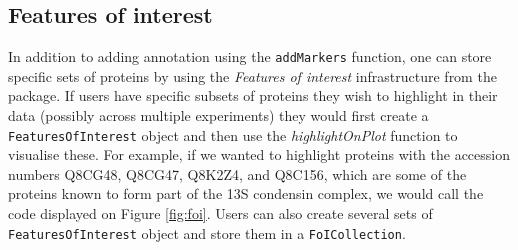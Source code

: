 \pagebreak

\subsection*{Features of interest}
In addition to adding annotation using the \texttt{addMarkers}
function, one can store specific sets of proteins by using the
\textit{Features of interest} infrastructure from the
 package. If users have specific subsets of proteins
they wish to highlight in their data (possibly across multiple
experiments) they would first create a \texttt{FeaturesOfInterest}
object and then use the \textit{highlightOnPlot} function to
visualise these. For example, if we wanted to highlight
proteins with the accession numbers Q8CG48, Q8CG47, Q8K2Z4, and
Q8C156, which are some of the proteins known to form part of the
13S condensin complex, we would call the code displayed
on Figure \ref{fig:foi}. Users can also create several sets of \texttt{FeaturesOfInterest}
object and store them in a \texttt{FoICollection}.

